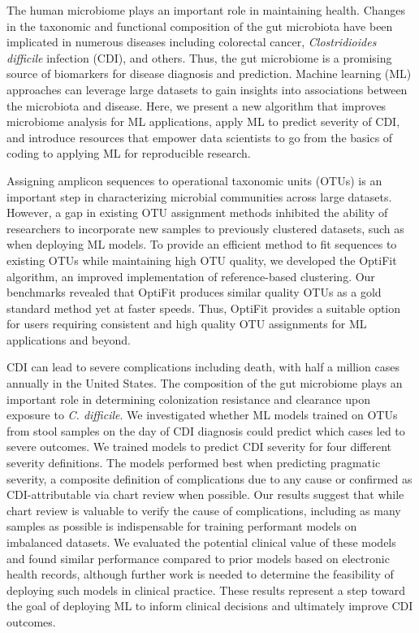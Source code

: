 The human microbiome plays an important role in maintaining health.
Changes in the taxonomic and functional composition of the gut microbiota have
been implicated in numerous diseases including colorectal cancer,
\textit{Clostridioides difficile} infection (CDI), and others.
Thus, the gut microbiome is a promising source of biomarkers for disease
diagnosis and prediction.
Machine learning (ML) approaches can leverage large datasets to gain insights
into associations between the microbiota and disease.
Here, we present a new algorithm that improves microbiome analysis for ML applications,
apply ML to predict severity of CDI,
and introduce resources that empower data scientists to go from the basics of
coding to applying ML for reproducible research.

Assigning amplicon sequences to operational taxonomic units (OTUs) is an
important step in characterizing microbial communities across large datasets.
However, a gap in existing OTU assignment methods inhibited the ability of
researchers to incorporate new samples to previously clustered datasets,
such as when deploying ML models.
To provide an efficient method to fit sequences to existing OTUs while
maintaining high OTU quality, we developed the OptiFit algorithm, an improved
implementation of reference-based clustering.
Our benchmarks revealed that OptiFit produces similar quality OTUs as a gold
standard method yet at faster speeds.
Thus, OptiFit provides a suitable option for users requiring consistent and
high quality OTU assignments for ML applications and beyond.

CDI can lead to severe complications including death, with half a million cases
annually in the United States.
The composition of the gut microbiome plays an important role in determining
colonization resistance and clearance upon exposure to \textit{C. difficile}.
We investigated whether ML models trained on OTUs from stool samples on
the day of CDI diagnosis could predict which cases led to severe outcomes.
We trained models to predict CDI severity for four different severity definitions.
The models performed best when predicting pragmatic severity, a composite
definition of complications due to any cause or confirmed as CDI-attributable
via chart review when possible.
Our results suggest that while chart review is valuable to verify the cause of
complications, including as many samples as possible is indispensable for
training performant models on imbalanced datasets.
We evaluated the potential clinical value of these models and found
similar performance compared to prior models based on electronic health records,
although further work is needed to determine the feasibility of deploying such
models in clinical practice.
These results represent a step toward the goal of deploying ML to
inform clinical decisions and ultimately improve CDI outcomes.

